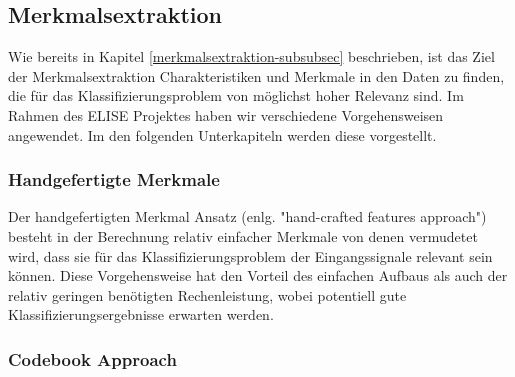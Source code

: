 \subsection{Merkmalsextraktion} \label{merkmalsextraftion-1}

Wie bereits in Kapitel \ref{merkmalsextraktion-subsubsec} beschrieben, ist das Ziel der Merkmalsextraktion Charakteristiken und Merkmale in den Daten zu finden, die für das
Klassifizierungsproblem von möglichst hoher Relevanz sind. Im Rahmen des ELISE Projektes haben wir verschiedene Vorgehensweisen angewendet. Im den folgenden Unterkapiteln werden diese vorgestellt. \\



\subsubsection{Handgefertigte Merkmale} \label{hc-features-1-subsubsection}
Der handgefertigten Merkmal Ansatz (enlg. "hand-crafted features approach") besteht in der Berechnung relativ einfacher Merkmale von denen vermudetet wird, dass sie für das Klassifizierungsproblem der Eingangssignale relevant sein können. Diese Vorgehensweise hat den Vorteil des einfachen Aufbaus als auch der relativ geringen benötigten Rechenleistung, wobei potentiell gute Klassifizierungsergebnisse erwarten werden. \\






\subsubsection{Codebook Approach} \label{ca-1-subsubsection}

